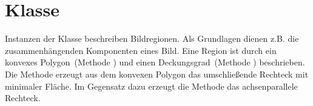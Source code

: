 \section{Klasse }
Instanzen der Klasse  beschreiben Bildregionen.
Als Grundlagen dienen z.B. die zusammenhängenden Komponenten eines Bild.
Eine Region ist durch ein konvexes Polygon~(Methode ) und einen Deckungsgrad~(Methode ) beschrieben.
Die Methode  erzeugt aus dem konvexen Polygon das umschließende Rechteck mit minimaler Fläche.
Im Gegensatz dazu erzeugt die Methode  das achsenparallele Rechteck.


